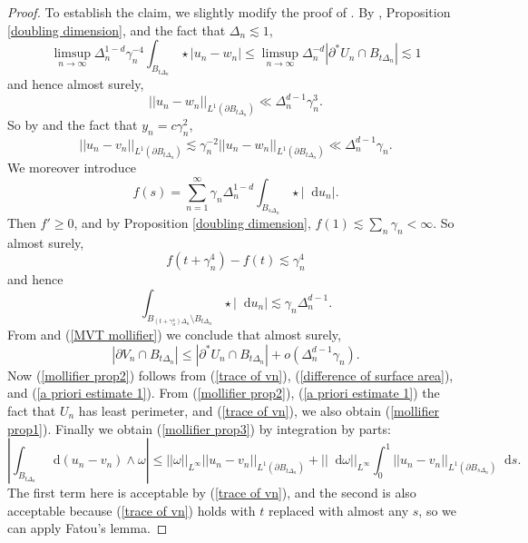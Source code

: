 \documentclass[reqno,12pt,letterpaper]{amsart}
\newcommand*\dif{\mathop{}\!\mathrm{d}}
\theoremstyle{definition}
\numberwithin{equation}{section}
\begin{document}
\begin{proof}
To establish the claim, we slightly modify the proof of \cite[Lemma 7.5]{Giusti77}.
By \cite[Lemma 7.2]{Giusti77}, Proposition \ref{doubling dimension}, and the fact that $\Delta_n \lesssim 1$,
$$\limsup_{n \to \infty} \Delta_n^{1 - d} \gamma_n^{-4} \int_{B_{t\Delta_n}} \star |u_n - w_n| \leq \limsup_{n \to \infty} \Delta_n^{-d} |\partial^* U_n \cap B_{t\Delta_n}| \lesssim 1$$
and hence almost surely,
$$||u_n - w_n||_{L^1(\partial B_{t\Delta_n})} \ll \Delta_n^{d - 1} \gamma_n^3.$$
So by \cite[Lemma 1.25]{Giusti77} and the fact that $y_n = c\gamma_n^2$,
\begin{equation}\label{trace of vn}
||u_n - v_n||_{L^1(\partial B_{t\Delta_n})} \lesssim \gamma_n^{-2} ||u_n - w_n||_{L^1(\partial B_{t\Delta_n})} \ll \Delta_n^{d - 1} \gamma_n.
\end{equation}
We moreover introduce
$$f(s) = \sum_{n=1}^\infty \gamma_n \Delta_n^{1 - d} \int_{B_{s \Delta_n}} \star |\dif u_n|.$$
Then $f' \geq 0$, and by Proposition \ref{doubling dimension}, $f(1) \lesssim \sum_n \gamma_n < \infty$.
So almost surely,
$$f(t + \gamma_n^4) - f(t) \lesssim \gamma_n^4$$
and hence
$$\int_{B_{(t + \gamma_n^4)\Delta_n} \setminus B_{t\Delta_n}} \star |\dif u_n| \lesssim \gamma_n \Delta_n^{d - 1}.$$
From \cite[Lemma 7.2]{Giusti77} and (\ref{MVT mollifier}) we conclude that almost surely,
\begin{equation}\label{difference of surface area}
|\partial V_n \cap B_{t\Delta_n}| \leq |\partial^* U_n \cap B_{t\Delta_n}| + o(\Delta_n^{d - 1} \gamma_n).
\end{equation}
Now (\ref{mollifier prop2}) follows from (\ref{trace of vn}), (\ref{difference of surface area}), and (\ref{a priori estimate 1}).
From (\ref{mollifier prop2}), (\ref{a priori estimate 1}) the fact that $U_n$ has least perimeter, and (\ref{trace of vn}), we also obtain (\ref{mollifier prop1}).
Finally we obtain (\ref{mollifier prop3}) by integration by parts:
$$\left|\int_{B_{t\Delta_n}} \dif (u_n - v_n) \wedge \omega\right| \leq ||\omega||_{L^\infty} ||u_n - v_n||_{L^1(\partial B_{t\Delta_n})} + ||\dif \omega||_{L^\infty} \int_0^1 ||u_n - v_n||_{L^1(\partial B_{s\Delta_n})} \dif s.$$
The first term here is acceptable by (\ref{trace of vn}), and the second is also acceptable because (\ref{trace of vn}) holds with $t$ replaced with almost any $s$, so we can apply Fatou's lemma.
\end{proof}



\end{document}
